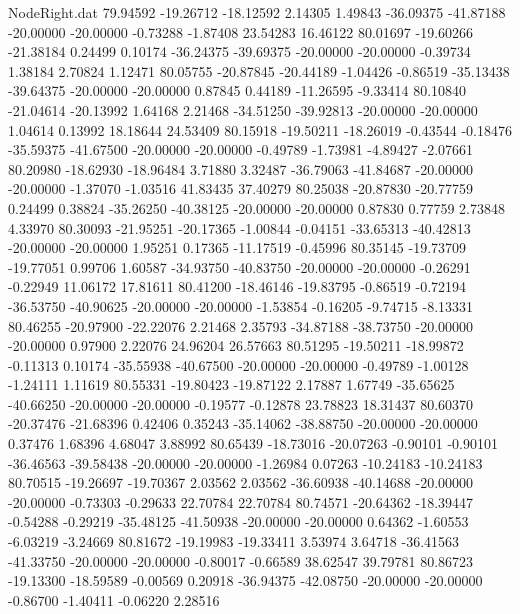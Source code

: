 \begin{filecontents}{NodeRight.dat}
  79.94592  -19.26712  -18.12592     2.14305    1.49843  -36.09375  -41.87188  -20.00000  -20.00000   -0.73288   -1.87408   23.54283   16.46122
  80.01697  -19.60266  -21.38184     0.24499    0.10174  -36.24375  -39.69375  -20.00000  -20.00000   -0.39734    1.38184    2.70824    1.12471
  80.05755  -20.87845  -20.44189    -1.04426   -0.86519  -35.13438  -39.64375  -20.00000  -20.00000    0.87845    0.44189  -11.26595   -9.33414
  80.10840  -21.04614  -20.13992     1.64168    2.21468  -34.51250  -39.92813  -20.00000  -20.00000    1.04614    0.13992   18.18644   24.53409
  80.15918  -19.50211  -18.26019    -0.43544   -0.18476  -35.59375  -41.67500  -20.00000  -20.00000   -0.49789   -1.73981   -4.89427   -2.07661
  80.20980  -18.62930  -18.96484     3.71880    3.32487  -36.79063  -41.84687  -20.00000  -20.00000   -1.37070   -1.03516   41.83435   37.40279
  80.25038  -20.87830  -20.77759     0.24499    0.38824  -35.26250  -40.38125  -20.00000  -20.00000    0.87830    0.77759    2.73848    4.33970
  80.30093  -21.95251  -20.17365    -1.00844   -0.04151  -33.65313  -40.42813  -20.00000  -20.00000    1.95251    0.17365  -11.17519   -0.45996
  80.35145  -19.73709  -19.77051     0.99706    1.60587  -34.93750  -40.83750  -20.00000  -20.00000   -0.26291   -0.22949   11.06172   17.81611
  80.41200  -18.46146  -19.83795    -0.86519   -0.72194  -36.53750  -40.90625  -20.00000  -20.00000   -1.53854   -0.16205   -9.74715   -8.13331
  80.46255  -20.97900  -22.22076     2.21468    2.35793  -34.87188  -38.73750  -20.00000  -20.00000    0.97900    2.22076   24.96204   26.57663
  80.51295  -19.50211  -18.99872    -0.11313    0.10174  -35.55938  -40.67500  -20.00000  -20.00000   -0.49789   -1.00128   -1.24111    1.11619
  80.55331  -19.80423  -19.87122     2.17887    1.67749  -35.65625  -40.66250  -20.00000  -20.00000   -0.19577   -0.12878   23.78823   18.31437
  80.60370  -20.37476  -21.68396     0.42406    0.35243  -35.14062  -38.88750  -20.00000  -20.00000    0.37476    1.68396    4.68047    3.88992
  80.65439  -18.73016  -20.07263    -0.90101   -0.90101  -36.46563  -39.58438  -20.00000  -20.00000   -1.26984    0.07263  -10.24183  -10.24183
  80.70515  -19.26697  -19.70367     2.03562    2.03562  -36.60938  -40.14688  -20.00000  -20.00000   -0.73303   -0.29633   22.70784   22.70784
  80.74571  -20.64362  -18.39447    -0.54288   -0.29219  -35.48125  -41.50938  -20.00000  -20.00000    0.64362   -1.60553   -6.03219   -3.24669
  80.81672  -19.19983  -19.33411     3.53974    3.64718  -36.41563  -41.33750  -20.00000  -20.00000   -0.80017   -0.66589   38.62547   39.79781
  80.86723  -19.13300  -18.59589    -0.00569    0.20918  -36.94375  -42.08750  -20.00000  -20.00000   -0.86700   -1.40411   -0.06220    2.28516

\end{filecontents}
